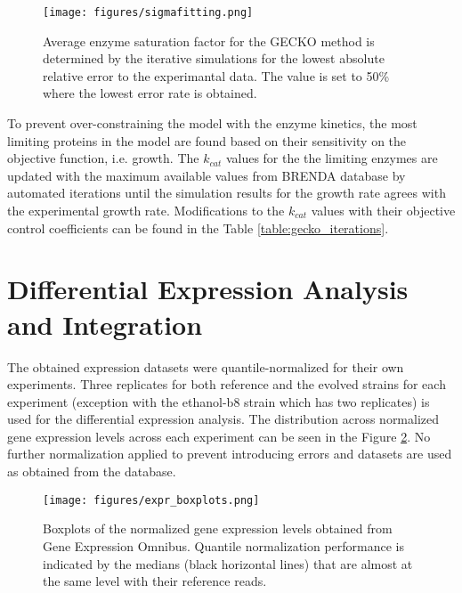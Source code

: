\begin{figure}[H]
  \begin{center}
    \texttt{[image: figures/sigmafitting.png]}
    \caption[Average enzyme saturation factor for the GECKO method is determined by the iterative simulations for the lowest absolute relative error to the experimantal data]{Average enzyme saturation factor for the GECKO method is determined by the iterative simulations for the lowest absolute relative error to the experimantal data. The value is set to 50\% where the lowest error rate is obtained.}
    \label{fig:sigma_fitting}
  \end{center}
\end{figure}

To prevent over-constraining the model with the enzyme kinetics, the most limiting proteins in the model are found based on their sensitivity on the objective function, i.e. growth. The $k_{cat}$ values for the the limiting enzymes are updated with the maximum available values from BRENDA\cite{jeske2019brenda} database by automated iterations until the simulation results for the growth rate agrees with the experimental growth rate. Modifications to the $k_{cat}$ values with their objective control coefficients can be found in the Table \ref{table:gecko_iterations}.



\vspace{-0.5cm}
\section{Differential Expression Analysis and Integration}

The obtained expression datasets were quantile-normalized for their own experiments. Three replicates for both reference and the evolved strains for each experiment (exception with the ethanol-b8 strain which has two replicates) is used for the differential expression analysis. The distribution across normalized gene expression levels across each experiment can be seen in the Figure \ref{fig:expr_boxplot}. No further normalization applied to prevent introducing errors and datasets are used as obtained from the database.

\begin{figure}[H]
  \begin{center}
  \texttt{[image: figures/expr\_boxplots.png]}
  \caption[Boxplots of the normalized gene expression levels]{Boxplots of the normalized gene expression levels obtained from Gene Expression Omnibus. Quantile normalization performance is indicated by the medians (black horizontal lines) that are almost at the same level with their reference reads.}
  \label{fig:expr_boxplot}
  \end{center}
\end{figure}

